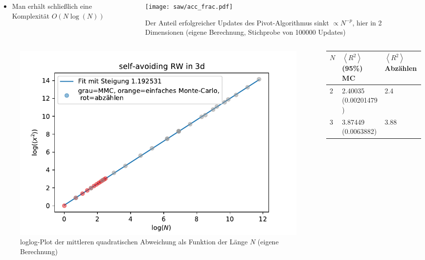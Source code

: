\documentclass{beamer}
\begin{document}
{\begin{frame}
\begin{columns}
\begin{column}{.5\textwidth}
\begin{itemize}
				\item Man erhält schließlich eine Komplexität $O(N \log (N))$
			\end{itemize}
		\end{column}
		\begin{column}{.5\textwidth}
			\begin{figure}
				\centering
				\texttt{[image: saw/acc\_frac.pdf]}
				\caption{Der Anteil erfolgreicher Updates des Pivot-Algorithmus sinkt $\propto N^{-p}$, hier in 2 Dimensionen (eigene Berechnung, Stichprobe von 100000 Updates)}
			\end{figure}
		\end{column}
	\end{columns}
\end{frame}
}
\begin{frame}
	\begin{columns}
		\begin{column}{.5\textwidth}
			\begin{figure}
				\centering
				\includegraphics[width=1.2\textwidth]{saw/saw3d.pdf}
				\caption{loglog-Plot der mittleren quadratischen Abweichung als Funktion der Länge $N$ (eigene Berechnung)}
			\end{figure}
		\end{column}
		\begin{column}[]{.5\textwidth}
			\tiny
			\begin{table}
				\begin{tabular}{|l|l|l|}
					\hline
					$N$&$\left<R^2\right>$ (95\%) MC& $\left<R^2\right>$ Abzählen\\ \hline
					2&2.40035 (0.00201479)& 2.4\\ \hline
					3&3.87449 (0.0063882)& 3.88\\ \hline

\end{tabular}
\end{table}
\end{column}
\end{columns}
\end{frame}
\end{document}

